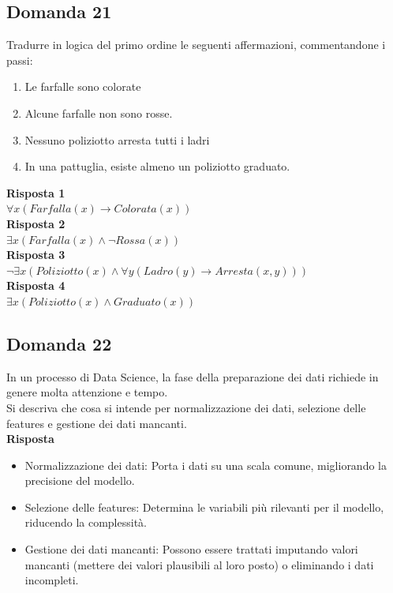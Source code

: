 \documentclass[../main.tex]{subfiles}
\begin{document}
	\subsection{Domanda 21}
	Tradurre in logica del primo ordine le seguenti affermazioni, commentandone i passi:
	\begin{enumerate}
		\item Le farfalle sono colorate 
		\item Alcune farfalle non sono rosse. 
		\item Nessuno poliziotto arresta tutti i ladri 
		\item In una pattuglia, esiste almeno un poliziotto graduato. 
	\end{enumerate}
	\textbf{Risposta 1}\\
	$\forall x (Farfalla(x) \to Colorata(x))$\\
	\textbf{Risposta 2}\\
	$\exists x (Farfalla(x) \land \neg Rossa(x))$\\
	\textbf{Risposta 3}\\
	$\neg \exists x (Poliziotto(x) \land \forall y (Ladro(y) \to Arresta(x, y)))$\\
	\textbf{Risposta 4}\\
	$\exists x (Poliziotto(x) \land Graduato(x))$
	\subsection{Domanda 22}
	In un processo di Data Science, la fase della preparazione dei dati richiede in genere molta attenzione e tempo. \\
	Si descriva che cosa si intende per normalizzazione dei dati, selezione delle features e gestione dei dati mancanti.\\
	\textbf{Risposta}\\
	\begin{itemize}
		\item Normalizzazione dei dati: Porta i dati su una scala comune, migliorando la precisione del modello.
		\item Selezione delle features: Determina le variabili più rilevanti per il modello, riducendo la complessità.
		\item Gestione dei dati mancanti: Possono essere trattati imputando valori mancanti (mettere dei valori plausibili al loro posto) o eliminando i dati incompleti.
	\end{itemize}
\end{document}
